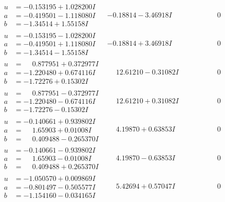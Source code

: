 \documentclass[1p]{elsarticle_modified}
\theoremstyle{definition}
\begin{document}
$$\begin{array}{c|c|c}
\begin{aligned}
u &= -0.153195 + 1.028200 I \\
a &= -0.419501 - 1.118080 I \\
b &= -1.34514 + 1.55158 I\end{aligned}
 & -0.18814 - 3.46918 I & \phantom{-0.000000 } 0 \\ \hline\begin{aligned}
u &= -0.153195 - 1.028200 I \\
a &= -0.419501 + 1.118080 I \\
b &= -1.34514 - 1.55158 I\end{aligned}
 & -0.18814 + 3.46918 I & \phantom{-0.000000 } 0 \\ \hline\begin{aligned}
u &= \phantom{-}0.877951 + 0.372977 I \\
a &= -1.220480 + 0.674116 I \\
b &= -1.72276 + 0.15302 I\end{aligned}
 & \phantom{-}12.61210 - 0.31082 I & \phantom{-0.000000 } 0 \\ \hline\begin{aligned}
u &= \phantom{-}0.877951 - 0.372977 I \\
a &= -1.220480 - 0.674116 I \\
b &= -1.72276 - 0.15302 I\end{aligned}
 & \phantom{-}12.61210 + 0.31082 I & \phantom{-0.000000 } 0 \\ \hline\begin{aligned}
u &= -0.140661 + 0.939802 I \\
a &= \phantom{-}1.65903 + 0.01008 I \\
b &= \phantom{-}0.409488 - 0.265370 I\end{aligned}
 & \phantom{-}4.19870 + 0.63853 I & \phantom{-0.000000 } 0 \\ \hline\begin{aligned}
u &= -0.140661 - 0.939802 I \\
a &= \phantom{-}1.65903 - 0.01008 I \\
b &= \phantom{-}0.409488 + 0.265370 I\end{aligned}
 & \phantom{-}4.19870 - 0.63853 I & \phantom{-0.000000 } 0 \\ \hline\begin{aligned}
u &= -1.050570 + 0.009869 I \\
a &= -0.801497 - 0.505577 I \\
b &= -1.154160 - 0.034165 I\end{aligned}
 & \phantom{-}5.42694 + 0.57047 I & \phantom{-0.000000 } 0 \\ \hline\begin{aligned}

\end{aligned}
\end{array}$$
\end{document}
